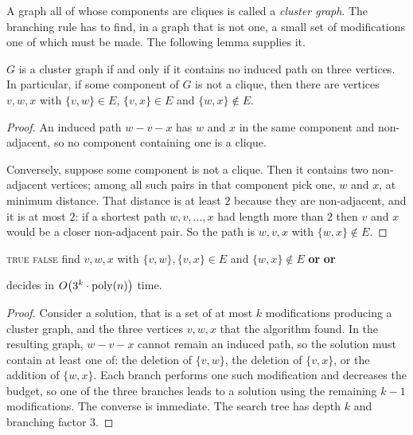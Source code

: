 A graph all of whose components are cliques is called a \emph{cluster graph}.
The branching rule has to find, in a graph that is not one, a small set of
modifications one of which must be made. The following lemma supplies it.

\begin{lemma}\label{lem:cluster-p3}
$G$ is a cluster graph if and only if it contains no induced path on three
vertices. In particular, if some component of $G$ is not a clique, then there
are vertices $v,w,x$ with $\{v,w\} \in E$, $\{v,x\} \in E$ and
$\{w,x\} \notin E$.
\end{lemma}

\begin{proof}
An induced path $w - v - x$ has $w$ and $x$ in the same component and
non-adjacent, so no component containing one is a clique.

Conversely, suppose some component is not a clique. Then it contains two
non-adjacent vertices; among all such pairs in that component pick one, $w$ and
$x$, at minimum distance. That distance is at least $2$ because they are
non-adjacent, and it is at most $2$: if a shortest path $w, v, \ldots, x$ had
length more than $2$ then $v$ and $x$ would be a closer non-adjacent pair. So
the path is $w, v, x$ with $\{w,x\} \notin E$.
\end{proof}

\begin{algorithm}[ht]
\caption{Branching for }
\label{alg:fpt-cluster}
\begin{algorithmic}[1]
     \Return \textsc{true} \EndIf
     \Return \textsc{false} \EndIf
    \State find $v,w,x$ with $\{v,w\},\{v,x\} \in E$ and $\{w,x\} \notin E$
    \State \Return {} \textbf{ or }
                    \textbf{ or }
  \EndFunction
\end{algorithmic}
\end{algorithm}

\begin{theorem}\label{thm:fpt-cluster}
 decides  in
$O\!\left(3^k \cdot \mathrm{poly}(n)\right)$ time.
\end{theorem}

\begin{proof}
Consider a solution, that is a set of at most $k$ modifications producing a
cluster graph, and the three vertices $v,w,x$ that the algorithm found. In the
resulting graph, $w-v-x$ cannot remain an induced path, so the solution must
contain at least one of: the deletion of $\{v,w\}$, the deletion of $\{v,x\}$,
or the addition of $\{w,x\}$. Each branch performs one such modification and
decreases the budget, so one of the three branches leads to a solution using the
remaining $k-1$ modifications. The converse is immediate. The search tree has
depth $k$ and branching factor $3$.
\end{proof}

